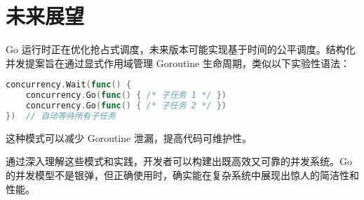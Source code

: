 \chapter{未来展望}
Go 运行时正在优化抢占式调度，未来版本可能实现基于时间的公平调度。结构化并发提案旨在通过显式作用域管理 Goroutine 生命周期，类似以下实验性语法：\par
\begin{lstlisting}[language=go]
concurrency.Wait(func() {
    concurrency.Go(func() { /* 子任务 1 */ })
    concurrency.Go(func() { /* 子任务 2 */ })
})  // 自动等待所有子任务
\end{lstlisting}
这种模式可以减少 Goroutine 泄漏，提高代码可维护性。\par
通过深入理解这些模式和实践，开发者可以构建出既高效又可靠的并发系统。Go 的并发模型不是银弹，但正确使用时，确实能在复杂系统中展现出惊人的简洁性和性能。\par
